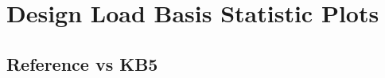 \newpage
\chapter{Design Load Basis Statistic Plots}
\section{Reference vs KB5}
\label{app:baseline-vs-KB6}


\clearpage

\clearpage

\clearpage

\clearpage

\clearpage

